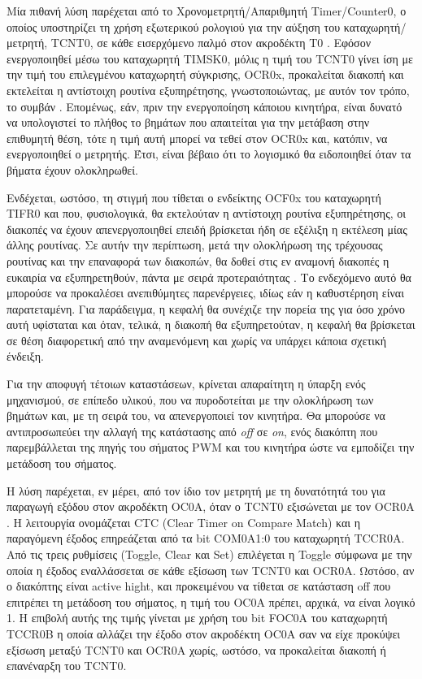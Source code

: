 Μία πιθανή λύση παρέχεται από το Χρονομετρητή\slash Απαριθμητή
\textenglish{Timer\slash Counter0}, ο οποίος υποστηρίζει τη χρήση εξωτερικού
ρολογιού για την αύξηση του καταχωρητή\slash μετρητή, TCNT0, σε κάθε εισερχόμενο
παλμό στον ακροδέκτη T0 \parencite[109]{atmel13}. Εφόσον ενεργοποιηθεί μέσω του
καταχωρητή TIMSK0, μόλις η τιμή του TCNT0 γίνει ίση με την τιμή του επιλεγμένου
καταχωρητή σύγκρισης, OCR0x, προκαλείται διακοπή και εκτελείται η αντίστοιχη
ρουτίνα εξυπηρέτησης, γνωστοποιώντας, με αυτόν τον τρόπο, το συμβάν
\parencite[110]{atmel13}. Επομένως, εάν, πριν την ενεργοποίηση κάποιου κινητήρα,
είναι δυνατό να υπολογιστεί το πλήθος το βημάτων που απαιτείται για την μετάβαση
στην επιθυμητή θέση, τότε η τιμή αυτή μπορεί να τεθεί στον OCR0x και, κατόπιν,
να ενεργοποιηθεί ο μετρητής. Έτσι, είναι βέβαιο ότι το λογισμικό θα ειδοποιηθεί
όταν τα βήματα έχουν ολοκληρωθεί.

Ενδέχεται, ωστόσο, τη στιγμή που τίθεται ο ενδείκτης OCF0x του καταχωρητή TIFR0
και που, φυσιολογικά, θα εκτελούταν η αντίστοιχη ρουτίνα εξυπηρέτησης, οι
διακοπές να έχουν απενεργοποιηθεί επειδή βρίσκεται ήδη σε εξέλιξη η εκτέλεση
μίας άλλης ρουτίνας. Σε αυτήν την περίπτωση, μετά την ολοκλήρωση της τρέχουσας
ρουτίνας και την επαναφορά των διακοπών, θα δοθεί στις εν αναμονή διακοπές η
ευκαιρία να εξυπηρετηθούν, πάντα με σειρά προτεραιότητας
\parencite[13--14,57]{atmel13}. Το ενδεχόμενο αυτό θα μπορούσε να προκαλέσει
ανεπιθύμητες παρενέργειες, ιδίως εάν η καθυστέρηση είναι παρατεταμένη. Για
παράδειγμα, η κεφαλή θα συνέχιζε την πορεία της για όσο χρόνο αυτή υφίσταται και
όταν, τελικά, η διακοπή θα εξυπηρετούταν, η κεφαλή θα βρίσκεται σε θέση
διαφορετική από την αναμενόμενη και χωρίς να υπάρχει κάποια σχετική ένδειξη.

Για την αποφυγή τέτοιων καταστάσεων, κρίνεται απαραίτητη η ύπαρξη ενός
μηχανισμού, σε επίπεδο υλικού, που να πυροδοτείται με την ολοκλήρωση των βημάτων
και, με τη σειρά του, να απενεργοποιεί τον κινητήρα. Θα μπορούσε να
αντιπροσωπεύει την αλλαγή της κατάστασης από \emph{off} σε \emph{on}, ενός
διακόπτη που παρεμβάλλεται της πηγής του σήματος PWM και του κινητήρα ώστε να
εμποδίζει την μετάδοση του σήματος.

Η λύση παρέχεται, εν μέρει, από τον ίδιο τον μετρητή με τη δυνατότητά του για
παραγωγή εξόδου στον ακροδέκτη OC0A, όταν ο TCNT0 εξισώνεται με τον OCR0A
\parencite[98--99,107]{atmel13}. Η λειτουργία ονομάζεται CTC (\textenglish{Clear
Timer on Compare Match}) και η παραγόμενη έξοδος επηρεάζεται από τα bit COM0A1:0
του καταχωρητή TCCR0A. Από τις τρεις ρυθμίσεις (\textenglish{Toggle, Clear} και
\textenglish{Set}) επιλέγεται η \textenglish{Toggle} σύμφωνα με την οποία η
έξοδος εναλλάσσεται σε κάθε εξίσωση των TCNT0 και OCR0A. Ωστόσο, αν ο διακόπτης
είναι \textenglish{active hight}, και προκειμένου να τίθεται σε κατάσταση
\textenglish{off} που επιτρέπει τη μετάδοση του σήματος, η τιμή του OC0A πρέπει,
αρχικά, να είναι λογικό 1. Η επιβολή αυτής της τιμής γίνεται με χρήση του bit
FOC0A του καταχωρητή TCCR0B η οποία αλλάζει την έξοδο στον ακροδέκτη OC0A σαν
να είχε προκύψει εξίσωση μεταξύ TCNT0 και OCR0A χωρίς, ωστόσο, να προκαλείται
διακοπή ή επανέναρξη του TCNT0.

